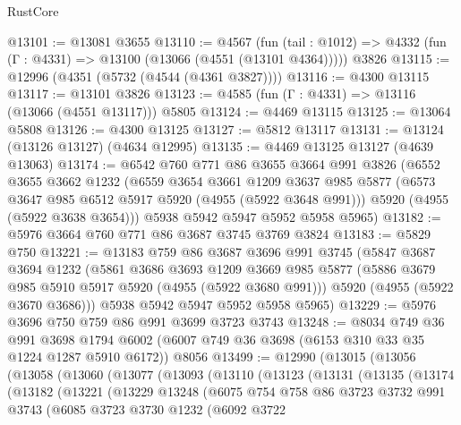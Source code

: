 \begin{lexlean}{RustCore}
\begin{coremodule}
@13101 := @13081 @3655
@13110 := @4567
    (fun (tail : @1012) => @4332 (fun (Γ : @4331) => @13100 (@13066 (@4551 (@13101 @4364)))))
    @3826
@13115 := @12996 (@4351 (@5732 (@4544 (@4361 @3827))))
@13116 := @4300 @13115
@13117 := @13101 @3826
@13123 := @4585 (fun (Γ : @4331) => @13116 (@13066 (@4551 @13117))) @5805
@13124 := @4469 @13115
@13125 := @13064 @5808
@13126 := @4300 @13125
@13127 := @5812 @13117
@13131 := @13124 (@13126 @13127) (@4634 @12995)
@13135 := @4469 @13125 @13127 (@4639 @13063)
@13174 := @6542
    @760
    @771
    @86
    @3655
    @3664
    @991
    @3826
    (@6552
      @3655
      @3662
      @1232
      (@6559
        @3654
        @3661
        @1209
        @3637
        @985
        @5877
        (@6573 @3647 @985 @6512 @5917 @5920 (@4955 (@5922 @3648 @991)))
        @5920
        (@4955 (@5922 @3638 @3654)))
      @5938
      @5942
      @5947
      @5952
      @5958
      @5965)
@13182 := @5976 @3664 @760 @771 @86 @3687 @3745 @3769 @3824
@13183 := @5829 @750
@13221 := @13183
    @759
    @86
    @3687
    @3696
    @991
    @3745
    (@5847
      @3687
      @3694
      @1232
      (@5861
        @3686
        @3693
        @1209
        @3669
        @985
        @5877
        (@5886 @3679 @985 @5910 @5917 @5920 (@4955 (@5922 @3680 @991)))
        @5920
        (@4955 (@5922 @3670 @3686)))
      @5938
      @5942
      @5947
      @5952
      @5958
      @5965)
@13229 := @5976 @3696 @750 @759 @86 @991 @3699 @3723 @3743
@13248 := @8034
    @749
    @36
    @991
    @3698
    @1794
    @6002
    (@6007 @749 @36 @3698 (@6153 @310 @33 @35 @1224 @1287 @5910 @6172))
    @8056
@13499 := @12990
    (@13015
      (@13056
        (@13058
          (@13060
            (@13077
              (@13093
                (@13110
                  (@13123
                    (@13131
                      (@13135
                        (@13174
                          (@13182
                            (@13221
                              (@13229
                                @13248
                                (@6075
                                  @754
                                  @758
                                  @86
                                  @3723
                                  @3732
                                  @991
                                  @3743
                                  (@6085
                                    @3723
                                    @3730
                                    @1232
                                    (@6092
                                      @3722

\end{coremodule}
\end{lexlean}
